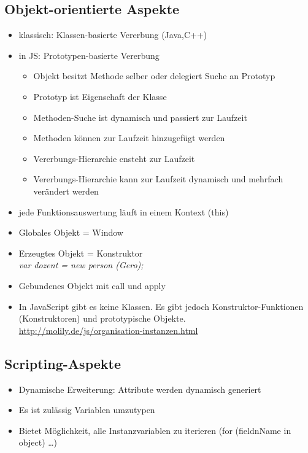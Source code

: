 \documentclass{article} %
\begin{document}
	\subsection{Objekt-orientierte Aspekte}
	\begin{itemize}
		\item klassisch: Klassen-basierte Vererbung (Java,C++)
		\item in JS: Prototypen-basierte Vererbung
		\begin{itemize}
			\item Objekt besitzt Methode selber oder delegiert Suche an Prototyp
			\item Prototyp ist Eigenschaft der Klasse
			\item Methoden-Suche ist dynamisch und passiert zur Laufzeit
			\item Methoden können zur Laufzeit hinzugefügt werden
			\item Vererbungs-Hierarchie ensteht zur Laufzeit
			\item Vererbungs-Hierarchie kann zur Laufzeit dynamisch und mehrfach verändert werden
		\end{itemize}
		\item jede Funktionsauswertung läuft in einem Kontext (this)
		\item Globales Objekt = Window 
		\item Erzeugtes Objekt = Konstruktor\\
		\textit{var dozent = new person (\glqq Gero\grqq);}
		\item Gebundenes Objekt mit call und apply
		\item In JavaScript gibt es keine Klassen. Es gibt jedoch Konstruktor-Funktionen (Konstruktoren) und prototypische Objekte.\\
		\url{http://molily.de/js/organisation-instanzen.html}
	\end{itemize}
	\subsection{Scripting-Aspekte}
	\begin{itemize}
		\item Dynamische Erweiterung: Attribute werden dynamisch generiert
		\item Es ist zulässig Variablen umzutypen
		\item Bietet Möglichkeit, alle Instanzvariablen zu iterieren (for (fieldnName in object) \dots)
	\end{itemize}
\end{document}
